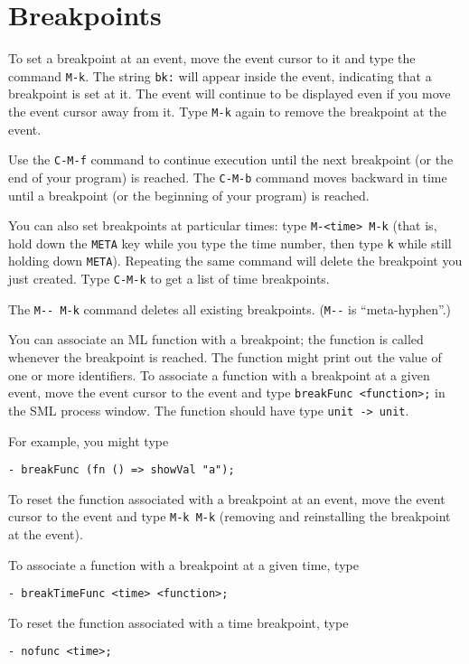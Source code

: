 \section{Breakpoints}
To set a breakpoint at an event, move the event cursor to it and type
the command \verb'M-k'.  The string \verb'bk:' will appear inside the event,
indicating that a breakpoint is set at it.  The event will continue to
be displayed even if you move the event cursor away from it.  Type \verb'M-k'
again to remove the breakpoint at the event.

Use the \verb'C-M-f' command to continue execution until the next breakpoint
(or the end of your program) is reached.  The \verb'C-M-b' command moves 
backward in time until a breakpoint (or the beginning of your program) is 
reached.

You can also set breakpoints at particular times: type
\verb'M-<time> M-k'
(that is, hold down the \verb'META' key while you type
the time number, then type \verb'k' while still holding down \verb'META').
Repeating the same command will delete the breakpoint
you just created.  Type \verb'C-M-k' to get a list of time breakpoints.

The \verb'M-- M-k' command deletes all existing breakpoints.
(\verb'M--' is ``meta-hyphen''.)

You can associate an ML function with a breakpoint; the function is
called whenever the breakpoint is reached.  The function might print
out the value of one or more identifiers.  To associate a function with
a breakpoint at a given event, move the event cursor to the event and
type \verb'breakFunc <function>;' in the SML process window.  The
function should have type \verb'unit -> unit'.

For example, you might type

\begin{verbatim}
- breakFunc (fn () => showVal "a");
\end{verbatim}

To reset the function associated with a breakpoint at an event, move
the event cursor to the event and type \verb'M-k M-k' (removing and
reinstalling the breakpoint at the event).

To associate a function with a breakpoint at a given time, type

\begin{verbatim}
- breakTimeFunc <time> <function>;
\end{verbatim}
To reset the function associated with a time breakpoint, type
\begin{verbatim}
- nofunc <time>;
\end{verbatim}


